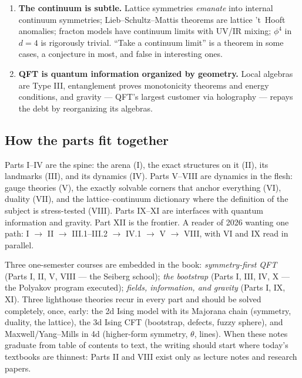 \begin{enumerate}
\item \textbf{The continuum is subtle.} Lattice symmetries \emph{emanate} into internal continuum symmetries; Lieb--Schultz--Mattis theorems are lattice 't~Hooft anomalies; fracton models have continuum limits with UV/IR mixing; $\phi^4$ in $d=4$ is rigorously trivial. ``Take a continuum limit'' is a theorem in some cases, a conjecture in most, and false in interesting ones.
\item \textbf{QFT is quantum information organized by geometry.} Local algebras are Type III, entanglement proves monotonicity theorems and energy conditions, and gravity --- QFT's largest customer via holography --- repays the debt by reorganizing its algebras.
\end{enumerate}

\subsection*{How the parts fit together}

Parts I--IV are the spine: the arena (I), the exact structures on it (II), its landmarks (III), and its dynamics (IV). Parts V--VIII are dynamics in the flesh: gauge theories (V), the exactly solvable corners that anchor everything (VI), duality (VII), and the lattice--continuum dictionary where the definition of the subject is stress-tested (VIII). Parts IX--XI are interfaces with quantum information and gravity. Part XII is the frontier. A reader of 2026 wanting one path: I $\to$ II $\to$ III.1--III.2 $\to$ IV.1 $\to$ V $\to$ VIII, with VI and IX read in parallel.

\noin Three one-semester courses are embedded in the book: \emph{symmetry-first QFT} (Parts I, II, V, VIII --- the Seiberg school); \emph{the bootstrap} (Parts I, III, IV, X --- the Polyakov program executed); \emph{fields, information, and gravity} (Parts I, IX, XI). Three lighthouse theories recur in every part and should be solved completely, once, early: the 2d Ising model with its Majorana chain (symmetry, duality, the lattice), the 3d Ising CFT (bootstrap, defects, fuzzy sphere), and Maxwell/Yang--Mills in 4d (higher-form symmetry, $\theta$, lines). When these notes graduate from table of contents to text, the writing should start where today's textbooks are thinnest: Parts II and VIII exist only as lecture notes and research papers.

\newpage


